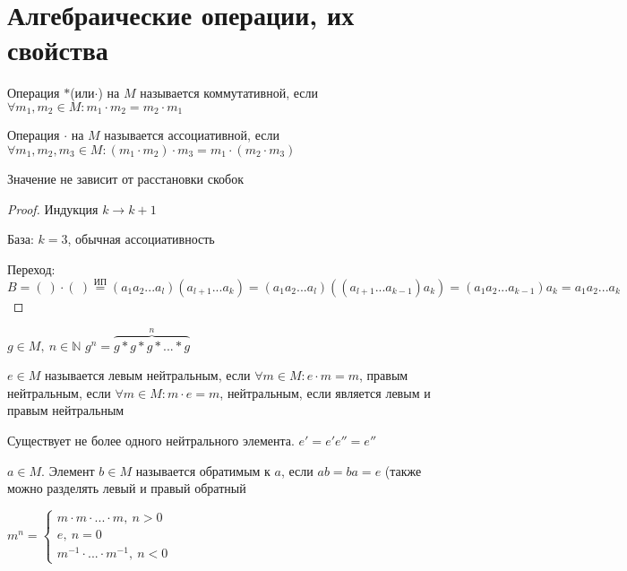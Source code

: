 \section{Алгебраические операции, их свойства}
\begin{conj}
    Операция $*$(или$\cdot$) на $M$ называется коммутативной, если $\forall m_1, m_2 \in M : m_1\cdot m_2 = m_2\cdot m_1$
\end{conj}
\begin{conj}
    Операция $\cdot$ на $M$ называется ассоциативной, если $\forall m_1, m_2, m_3 \in M: (m_1\cdot m_2)\cdot m_3 = m_1\cdot(m_2\cdot m_3)$
\end{conj}
\begin{theorem}
Значение не зависит от расстановки скобок
\end{theorem}
\begin{proof}
Индукция $k \to k+1$

База: $k=3$, обычная ассоциативность

Переход: $B = (\ )\cdot(\ ) \overset{\text{ИП}}{=} (a_1a_2...a_l)(a_{l+1}...a_k) = (a_1a_2...a_l)((a_{l+1}...a_{k-1})a_k) = (a_1a_2...a_{k-1})a_k = a_1a_2...a_k$
\end{proof}
\begin{conj}
    $g \in M,\ n \in \mathbb{N}$ $g^n=\overbrace{g*g*g*...*g}^n$
\end{conj}

\begin{conj}
    $e \in M$ называется левым нейтральным, если $\forall m \in M: e\cdot m = m$, правым нейтральным, если $\forall m \in M: m\cdot e = m$, нейтральным, если является левым и правым нейтральным
\end{conj}
\begin{theorem-non}
    Существует не более одного нейтрального элемента. $e' = e'e'' = e''$
\end{theorem-non}
\begin{conj}
    $a \in M$. Элемент $b \in M$ называется обратимым к $a$, если $ab = ba = e$ (также можно разделять левый и правый обратный
\end{conj}
\begin{conj}
    $m^n = \begin{cases}
    m\cdot m\cdot ...\cdot m,\ n>0\\
    e,\ n=0\\
    m^{-1}\cdot ... \cdot m^{-1},\ n<0
    \end{cases}$
\end{conj}